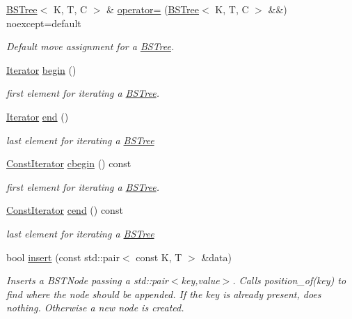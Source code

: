 \begin{DoxyCompactItemize}
\hyperlink{class_b_s_tree}{B\+S\+Tree}$<$ K, T, C $>$ \& \hyperlink{class_b_s_tree_a555de0952655377d903ecbc1ce6bdec3}{operator=} (\hyperlink{class_b_s_tree}{B\+S\+Tree}$<$ K, T, C $>$ \&\&) noexcept=default
\begin{DoxyCompactList}\small\item\em Default move assignment for a \hyperlink{class_b_s_tree}{B\+S\+Tree}. \end{DoxyCompactList}\item 
\hyperlink{class_b_s_tree_1_1_iterator}{Iterator} \hyperlink{class_b_s_tree_afb41cae2749cded61f805bb1b902f811}{begin} ()
\begin{DoxyCompactList}\small\item\em first element for iterating a \hyperlink{class_b_s_tree}{B\+S\+Tree}. \end{DoxyCompactList}\item 
\hyperlink{class_b_s_tree_1_1_iterator}{Iterator} \hyperlink{class_b_s_tree_af08ce4b341b8503949ede9d4e6af8c8b}{end} ()
\begin{DoxyCompactList}\small\item\em last element for iterating a \hyperlink{class_b_s_tree}{B\+S\+Tree} \end{DoxyCompactList}\item 
\hyperlink{class_b_s_tree_1_1_const_iterator}{Const\+Iterator} \hyperlink{class_b_s_tree_a575273bc2b272f20f8b6802f2b0a756f}{cbegin} () const
\begin{DoxyCompactList}\small\item\em first element for iterating a \hyperlink{class_b_s_tree}{B\+S\+Tree}. \end{DoxyCompactList}\item 
\hyperlink{class_b_s_tree_1_1_const_iterator}{Const\+Iterator} \hyperlink{class_b_s_tree_a562638580a40643c76913e51dd06c13b}{cend} () const
\begin{DoxyCompactList}\small\item\em last element for iterating a \hyperlink{class_b_s_tree}{B\+S\+Tree} \end{DoxyCompactList}\item 
bool \hyperlink{class_b_s_tree_a23746c31f7583acad81c9b7f08159003}{insert} (const std\+::pair$<$ const K, T $>$ \&data)
\begin{DoxyCompactList}\small\item\em Inserts a B\+S\+T\+Node passing a std\+::pair$<$key,value$>$. Calls position\+\_\+of(key) to find where the node should be appended. If the key is already present, does nothing. Otherwise a new node is created. \end{DoxyCompactList}\item 

\end{DoxyCompactItemize}
